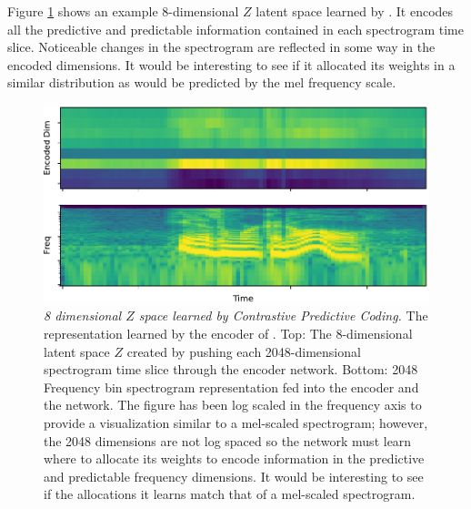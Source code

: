 Figure \ref{fig:encoder} shows an example 8-dimensional $Z$ latent space learned by \CPC. It encodes all the predictive and predictable information contained in each spectrogram time slice. Noticeable changes in the spectrogram are reflected in some way in the encoded dimensions. It would be interesting to see if it allocated its weights in a similar distribution as would be predicted by the mel frequency scale.

\begin{figure}[tbp] 
  \centering
  \includegraphics[width=\textwidth]{figures/encoder.pdf}
  \caption[8 dimensional $Z$ space learned by Contrastive Predictive Coding.]
{\emph{8 dimensional $Z$ space learned by Contrastive Predictive Coding.} The representation learned by the encoder of \CPC. Top: The 8-dimensional latent space $Z$ created by pushing each 2048-dimensional spectrogram time slice through the encoder network. Bottom: 2048 Frequency bin spectrogram representation fed into the encoder and the \CPC network. The figure has been log scaled in the frequency axis to provide a visualization similar to a mel-scaled spectrogram; however, the 2048 dimensions are not log spaced so the \CPC network must learn where to allocate its weights to encode information in the predictive and predictable frequency dimensions. It would be interesting to see if the allocations it learns match that of a mel-scaled spectrogram.
}
  \label{fig:encoder}
\end{figure}

